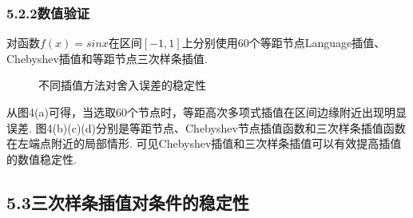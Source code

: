 \documentclass[12pt]{article}
\begin{document}
\par 

\subsubsection*{{\small 5.2.2}\quad\small\heiti 数值验证} 
\par 对函数$f(x)=sinx$在区间$[-1,1]$上分别使用60个等距节点Language插值、Chebyshev插值和等距节点三次样条插值.

\begin{figure}[h]
	\label{fig05} 
	\caption{不同插值方法对舍入误差的稳定性}
\end{figure}

\par 从图4(a)可得，当选取60个节点时，等距高次多项式插值在区间边缘附近出现明显误差. 图4(b)(c)(d)分别是等距节点、Chebyshev节点插值函数和三次样条插值函数在左端点附近的局部情形. 可见Chebyshev插值和三次样条插值可以有效提高插值的数值稳定性.

\subsection*{{\normalsize 5.3}\quad\normalsize\heiti 三次样条插值对条件的稳定性} 
\end{document}
